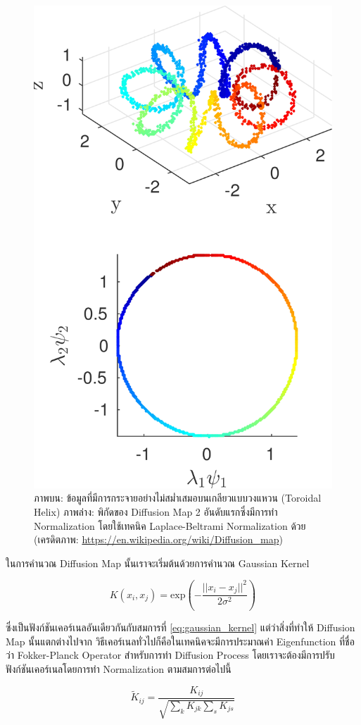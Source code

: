 \begin{figure}[htbp]
    \centering
    \includegraphics[width=0.6\linewidth]{fig/diffusion_map.jpg}
    \caption{ภาพบน: ข้อมูลที่มีการกระจายอย่างไม่สม่ำเสมอบนเกลียวแบบวงแหวน (Toroidal Helix) ภาพล่าง: พิกัดของ Diffusion Map 
    2 อันดับแรกซึ่งมีการทำ Normalization โดยใช้เทคนิค Laplace-Beltrami Normalization ด้วย
    (เครดิตภาพ: \url{https://en.wikipedia.org/wiki/Diffusion_map})}
    \label{fig:diffusion_map}
\end{figure}

ในการคำนวณ Diffusion Map นั้นเราจะเริ่มต้นด้วยการคำนวณ Gaussian Kernel

\begin{equation}
    K(x_{i}, x_{j}) = \mathrm{exp}\left( -\frac{||x_i-x_j||^2}{2\sigma^2} \right)
\end{equation}

\noindent ซึ่งเป็นฟังก์ชันเคอร์เนลอันเดียวกันกับสมการที่ \ref{eq:gaussian_kernel} แต่ว่าสิ่งที่ทำให้ Diffusion Map นั้นแตกต่างไปจาก%
วิธีเคอร์เนลทั่วไปก็คือในเทคนิคจะมีการประมาณค่า Eigenfunction ที่ชื่อว่า Fokker-Planck Operator สำหรับการทำ Diffusion Process%
\autocite{trstanova2020} โดยเราจะต้องมีการปรับฟังก์ชันเคอร์เนลโดยการทำ Normalization\autocite{nadler2006} ตามสมการต่อไปนี้

\begin{equation}
    \tilde{K}_{ij} = \frac{K_{ij}}{\sqrt{\sum_{k}K_{jk} \sum_{s}K_{js}}}
\end{equation}

